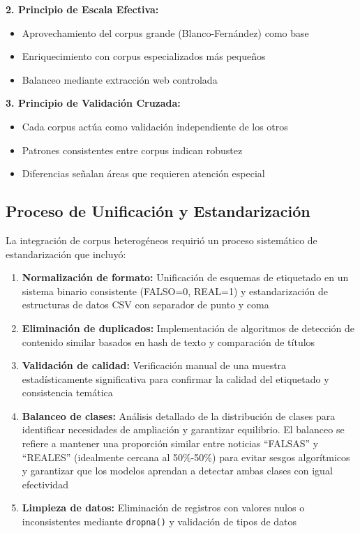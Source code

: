 \textbf{2. Principio de Escala Efectiva:}
\begin{itemize}
    \item Aprovechamiento del corpus grande (Blanco-Fernández) como base
    \item Enriquecimiento con corpus especializados más pequeños
    \item Balanceo mediante extracción web controlada
\end{itemize}

\textbf{3. Principio de Validación Cruzada:}
\begin{itemize}
    \item Cada corpus actúa como validación independiente de los otros
    \item Patrones consistentes entre corpus indican robustez
    \item Diferencias señalan áreas que requieren atención especial
\end{itemize}

\subsection{Proceso de Unificación y Estandarización}

La integración de corpus heterogéneos requirió un proceso sistemático de estandarización que incluyó:

\begin{enumerate}
    \item \textbf{Normalización de formato:} Unificación de esquemas de etiquetado en un sistema binario consistente (FALSO=0, REAL=1) y estandarización de estructuras de datos CSV con separador de punto y coma
    \item \textbf{Eliminación de duplicados:} Implementación de algoritmos de detección de contenido similar basados en hash de texto y comparación de títulos
    \item \textbf{Validación de calidad:} Verificación manual de una muestra estadísticamente significativa para confirmar la calidad del etiquetado y consistencia temática
    \item \textbf{Balanceo de clases:} Análisis detallado de la distribución de clases para identificar necesidades de ampliación y garantizar equilibrio. El balanceo se refiere a mantener una proporción similar entre noticias ``FALSAS'' y ``REALES'' (idealmente cercana al 50\%-50\%) para evitar sesgos algorítmicos y garantizar que los modelos aprendan a detectar ambas clases con igual efectividad
    \item \textbf{Limpieza de datos:} Eliminación de registros con valores nulos o inconsistentes mediante \texttt{dropna()} y validación de tipos de datos
\end{enumerate}

